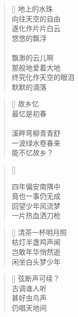 \renewcommand{\poemtoc}{section}
\settowidth{\versewidth}{秋高气爽 QA射雕}
\begin{verse}[\versewidth]
地上的水珠\\
向往天空的自由\\
遂化作片片白云\\
悠悠的飘浮\\
~\\
飘渺的云儿啊\\
那般地爱着大地\\
终究化作天空的眼泪\\
默默的滴落
\end{verse}

\renewcommand{\poemtoc}{section}
\settowidth{\versewidth}{溪畔弯柳青青舒}
\begin{verse}[\versewidth]
故乡忆\\
最忆是初春\\
~\\
溪畔弯柳青青舒\\
一波绿水卷春来\\
能不忆故乡？
\end{verse}

\renewcommand{\poemtoc}{section}
\settowidth{\versewidth}{四年偏安南隅中}
\begin{verse}[\versewidth]

四年偏安南隅中\\
竟也一事仍无成\\
回望少年风流梦\\
一片热血洒刀枪
\end{verse}

\renewcommand{\poemtoc}{section}
\settowidth{\versewidth}{四年偏安南隅中}
\begin{verse}[\versewidth]
清茶一杯明月照\\
枯灯半盏鸡声闻\\
岂敢年华悄然逝\\
闲坐白头梦少年\\
\end{verse}

\renewcommand{\poemtoc}{section}
\settowidth{\versewidth}{弦断声可续}
\begin{verse}[\versewidth]
弦断声可续？\\
古调谁人听\\
甚好虫鸟声\\
仍唱天地间
\end{verse}

